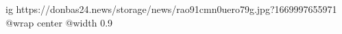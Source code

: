  
 
 
 
 

\ifcmt
  ig https://donbas24.news/storage/news/rao91cmn0uero79g.jpg?1669997655971
  @wrap center
  @width 0.9
\fi
